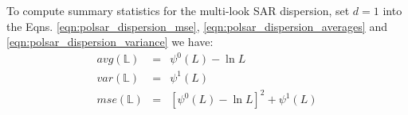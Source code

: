 \documentclass[journal]{IEEEtran}
\begin{document}
%

To compute summary statistics for the multi-look SAR dispersion,
  set $d=1$ into the Eqns. \ref{eqn:polsar_dispersion_mse}, \ref{eqn:polsar_dispersion_averages} and \ref{eqn:polsar_dispersion_variance}
we have:
  \begin{eqnarray*}
    avg(\mathbb{L}) &=& \psi^0(L) - \ln{L} \\
    var(\mathbb{L}) &=& \psi^1(L) \\
    mse(\mathbb{L}) &=& \left[ \psi^0(L) - \ln{L} \right]^2 + \psi^1(L)
\end{eqnarray*}
\end{document}
